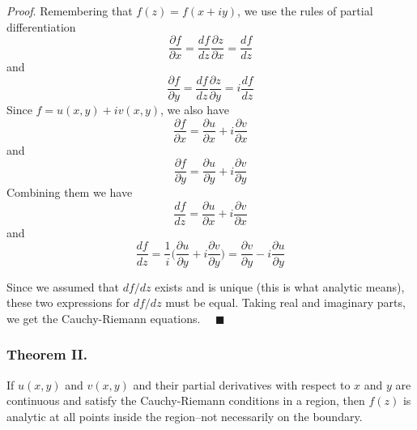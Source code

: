 \documentclass[../../../main.tex]{subfiles}
\begin{document}
\emph{Proof}. Remembering that $f (z)= f (x + iy)$, we use the rules of partial differentiation
\begin{equation*}
    \frac{\partial f}{\partial x}=\frac{df}{dz}\frac{\partial z}{\partial x}=\frac{df}{dz}
\end{equation*}
and
\begin{equation*}
    \frac{\partial f}{\partial y}=\frac{df}{dz}\frac{\partial z}{\partial y}=i\frac{df}{dz}
\end{equation*}
Since $f = u(x, y) + iv(x, y)$, we also have
\begin{equation*}
    \frac{\partial f}{\partial x}=\frac{\partial u}{\partial x}+i \frac{\partial v}{\partial x}
\end{equation*}
and
\begin{equation*}
    \frac{\partial f}{\partial y}=\frac{\partial u}{\partial y}+i \frac{\partial v}{\partial y}
\end{equation*}
Combining them we have
\begin{equation*}
    \frac{df}{dz}=\frac{\partial u}{\partial x}+i \frac{\partial v}{\partial x}
\end{equation*}
and
\begin{equation*}
    \frac{df}{dz}=\frac{1}{i}\biggl(\frac{\partial u}{\partial y}+i \frac{\partial v}{\partial y}\biggr) =\frac{\partial v}{\partial y}-i \frac{\partial u}{\partial y}
\end{equation*}

Since we assumed that $df /dz$ exists and is unique (this is what analytic means), these two expressions for $df /dz$ must be equal. Taking real and imaginary parts, we get the Cauchy-Riemann equations. $\quad \blacksquare$

\subsubsection{Theorem II.} If $u(x, y)$ and $v(x, y)$ and their partial derivatives with respect to $x$ and $y$ are continuous and satisfy the Cauchy-Riemann conditions in a region, then $f(z)$ is analytic at all points inside the region--not necessarily on the boundary.
\end{document}
